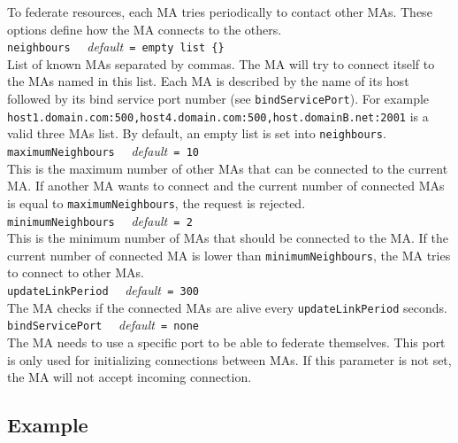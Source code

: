 To federate resources, each MA tries periodically to contact other
MAs. These options define how the MA connects to the others.\\

\noindent
\texttt{neighbours} \ \ \emph{default}\texttt{ = empty list \{\}} \\ List of
known MAs separated by commas. The MA will try to connect itself to the MAs
named in this list. Each MA is described by the name of its host followed by
its bind service port number (see \texttt{bindServicePort}). For example
\texttt{host1.domain.com:500,host4.domain.com:500,host.domainB.net:2001} is a
valid three MAs list. By default, an empty list is set into
\texttt{neighbours}.\\

\noindent
\texttt{maximumNeighbours} \ \ \emph{default}\texttt{ = 10}\\ This is the
maximum number of other MAs that can be connected to the current MA.  If
another MA wants to connect and the current number of connected MAs is equal to
\texttt{maximumNeighbours}, the request is rejected.\\

\noindent
\texttt{minimumNeighbours} \ \ \emph{default}\texttt{ = 2}\\ This is
the minimum number of MAs that should be connected to the MA. If the
current number of connected MA is lower than
\texttt{minimumNeighbours}, the MA tries to connect to other MAs.\\

\noindent
\texttt{updateLinkPeriod} \ \ \emph{default}\texttt{ = 300}\\ The MA
checks if the connected MAs are alive every \texttt{updateLinkPeriod}
seconds.\\

\noindent
\texttt{bindServicePort} \ \ \emph{default}\texttt{ = none}\\ 
The MA needs to use a specific port to be able to federate themselves. This
port is only used for initializing connections between MAs. If this
parameter is not set, the MA will not accept incoming connection.\\



\subsection{Example}
\label{sec:deploy_ex}

